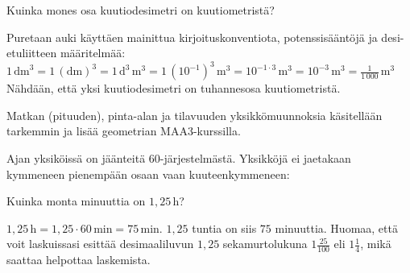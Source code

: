 \begin{esimerkki}
Kuinka mones osa kuutiodesimetri on kuutiometristä?

	\begin{esimratk}
	Puretaan auki käyttäen mainittua kirjoituskonventiota, potenssisääntöjä ja desi-etuliitteen määritelmää:
	$1\,\text{dm}^3=1\,(\text{dm})^3=1\,\text{d}^3\,\text{m}^3=1\,(10^{-1})^3\,\text{m}^3=10^{-1\cdot3}\,\text{m}^3=10^{-3}\,\text{m}^3=\frac{1}{1\,000}\,\text{m}^3$
	Nähdään, että yksi kuutiodesimetri on tuhannesosa kuutiometristä.
	\end{esimratk}

\end{esimerkki}







Matkan (pituuden), pinta-alan ja tilavuuden yksikkömuunnoksia käsitellään tarkemmin ja lisää geometrian MAA3-kurssilla. 

Ajan yksiköissä on jäänteitä $60$-järjestelmästä. Yksikköjä ei jaetakaan kymmeneen pienempään osaan vaan kuuteenkymmeneen:


%
%
%
%

\begin{esimerkki}
Kuinka monta minuuttia on $1,25$\,h?

\begin{esimratk}
$1,25\,\text{h} = 1,25 \cdot 60\,\text{min} = 75\,\text{min}$. $1,25$ tuntia on siis $75$ minuuttia. Huomaa, että voit laskuissasi esittää desimaaliluvun $1,25$ sekamurtolukuna $1\frac{25}{100}$ eli $1\frac{1}{4}$, mikä saattaa helpottaa laskemista.
\end{esimratk}
\end{esimerkki}

